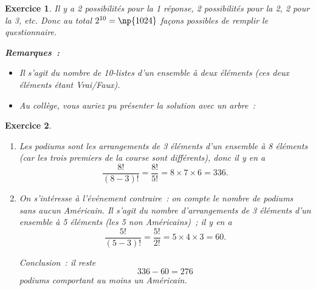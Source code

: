 \documentclass[10pt]{article}
\newtheorem{exo}{Exercice}
\begin{document}
\begin{exo}

Il y a 2 possibilités pour la 1 réponse, 2 possibilités pour la 2, 2 pour la 3, etc. Donc au total $2^{10}=\np{1024}$ façons possibles de remplir le questionnaire.

\medskip

\textbf{Remarques~:}

\begin{itemize}
\item[\textbullet] Il s'agit du nombre de 10-listes d'un ensemble à deux éléments (ces deux éléments étant Vrai/Faux).
\item[\textbullet] Au collège, vous auriez pu présenter la solution avec un arbre~:

\begin{center}
\end{center}

\end{itemize}


\end{exo}

\begin{exo}



\begin{enumerate}
\item Les podiums sont les arrangements de 3 éléments d'un ensemble à 8 éléments (car les trois premiers de la course sont différents), donc il y en a 
\[\frac{8!}{(8-3)!}=\frac{8!}{5!}=8\times 7\times 6=336.\]
\item On s'intéresse à l'événement contraire~: on compte le nombre de podiums sans aucun Américain. Il s'agit du nombre d'arrangements de 3 éléments d'un ensemble à 5 éléments (les 5 non Américains)~; il y en a 
\[\frac{5!}{(5-3)!}=\frac{5!}{2!}=5\times 4\times 3=60.\]

Conclusion~: il reste \[336-60=276\] podiums comportant au moins un Américain.
\end{enumerate}

\end{exo}
\end{document}
